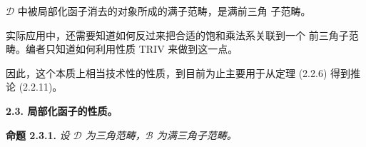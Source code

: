 $\mathcal D$ 中被局部化函子消去的对象所成的满子范畴，是满前三角
子范畴。

实际应用中，还需要知道如何反过来把合适的饱和乘法系关联到一个
前三角子范畴。编者只知道如何利用性质 TRIV 来做到这一点。

因此，这个本质上相当技术性的性质，到目前为止主要用于从定理
(2.2.6) 得到推论 (2.2.11)。

\medskip
\noindent\textbf{2.3. 局部化函子的性质。}

\smallskip
\noindent\textbf{命题 2.3.1.}\quad
\itshape 设 $\mathcal D$ 为三角范畴，$\mathcal B$ 为满三角子范畴。\upshape

\endgroup
